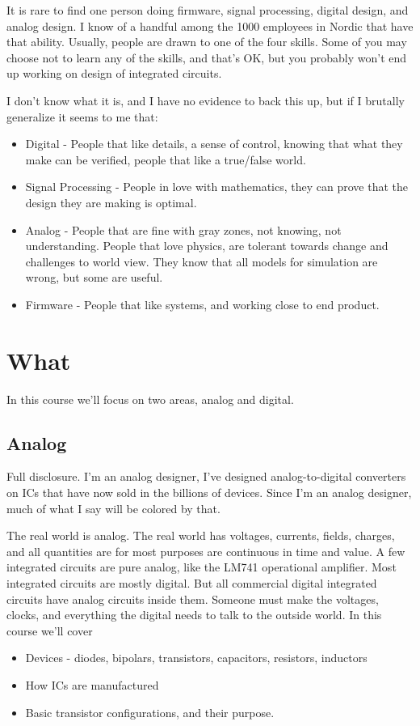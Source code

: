 \documentclass[technote,10pt,a4paper]{IEEEtran}
\begin{document}
It is rare to find one person doing firmware, signal processing, digital design, and analog design.
I know of a handful among the 1000 employees in Nordic that have
that ability. Usually, people are drawn to one of the four skills. Some of you
may choose not to learn any of the skills, and that's OK, but you probably won't
end up working on design of integrated circuits.

I don't know what it is, and I have no evidence to back this up, but if I
brutally generalize it seems to me that:
\begin{itemize}
\item Digital - People that like details, a sense of control, knowing that what
        they make can be verified, people that like a true/false world.
\item Signal Processing - People in love with mathematics, they can prove that the design they are making is optimal.
\item Analog - People that are fine with gray zones, not knowing, not
        understanding. People that love physics, are tolerant towards change and
        challenges to world view. They know that all models for simulation are
        wrong, but some are useful.
\item Firmware - People that like systems, and working close to end product.
\end{itemize}

\section{What}
In this course we'll focus on two areas, analog and digital.

\subsection{Analog}
Full disclosure. I'm an analog designer, I've designed analog-to-digital converters
on ICs that have now sold in the billions of devices. Since I'm an analog designer, much of what I say will be
colored by that.

The real world is analog. The real world has voltages, currents, fields,
charges, and all quantities are for most purposes are continuous in time and value.
A few integrated circuits are pure analog, like the LM741 operational
amplifier. Most integrated circuits are mostly digital. But all commercial digital
integrated circuits have analog circuits inside them. Someone must make the
voltages, clocks, and everything the digital needs to talk to the outside world.
In this course we'll cover
\begin{itemize}
  \item Devices - diodes, bipolars, transistors, capacitors, resistors,
        inductors
  \item How ICs are manufactured
  \item Basic transistor configurations, and their purpose.
\end{itemize}
\end{document}
